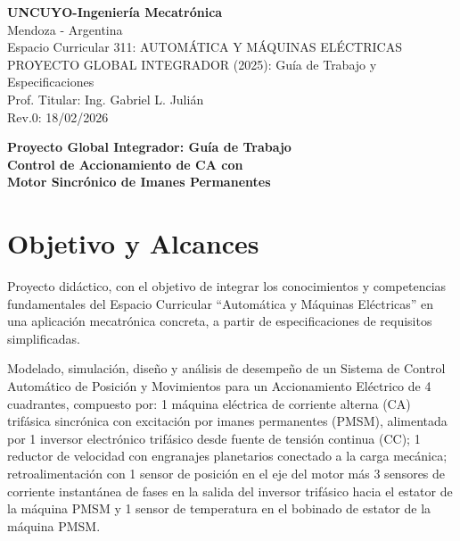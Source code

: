 \documentclass[11pt,a4paper]{article}
\begin{document}
\noindent\textbf{UNCUYO-Ingeniería Mecatrónica}\\
Mendoza - Argentina\\
Espacio Curricular 311: AUTOMÁTICA Y MÁQUINAS ELÉCTRICAS\\
PROYECTO GLOBAL INTEGRADOR (2025): Guía de Trabajo y Especificaciones\\
Prof. Titular: Ing. Gabriel L. Julián\\
Rev.0: 18/02/2026\\[1.5em]

\begin{center}
    \Large\textbf{Proyecto Global Integrador: Guía de Trabajo}\\[0.5em]
    \LARGE\textbf{Control de Accionamiento de CA con\\ Motor Sincrónico de Imanes Permanentes}
\end{center}
\vspace{1em}

\section{Objetivo y Alcances}
Proyecto didáctico, con el objetivo de integrar los conocimientos y competencias fundamentales del Espacio Curricular ``Automática y Máquinas Eléctricas'' en una aplicación mecatrónica concreta, a partir de especificaciones de requisitos simplificadas.

Modelado, simulación, diseño y análisis de desempeño de un Sistema de Control Automático de Posición y Movimientos para un Accionamiento Eléctrico de 4 cuadrantes, compuesto por: 1 máquina eléctrica de corriente alterna (CA) trifásica sincrónica con excitación por imanes permanentes (PMSM), alimentada por 1 inversor electrónico trifásico desde fuente de tensión continua (CC); 1 reductor de velocidad con engranajes planetarios conectado a la carga mecánica; retroalimentación con 1 sensor de posición en el eje del motor más 3 sensores de corriente instantánea de fases en la salida del inversor trifásico hacia el estator de la máquina PMSM y 1 sensor de temperatura en el bobinado de estator de la máquina PMSM.

\end{document}
